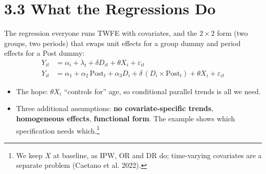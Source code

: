 \documentclass[
  11pt,
  ignorenonframetext,
  aspectratio=169,
]{beamer}
\providecommand{\tightlist}{%
  \setlength{\itemsep}{0pt}\setlength{\parskip}{0pt}}
\begin{document}
\section{3.3 What the Regressions Do}\label{what-the-regressions-do}

\begin{frame}{The regression everyone runs}
\protect{}\label{the-regression-everyone-runs}
TWFE with covariates, and the \(2 \times 2\) form (two groups, two
periods) that swaps unit effects for a group dummy and period effects
for a Post dummy: \[
\begin{aligned}
Y_{it} &= \alpha_i + \lambda_t + \delta D_{it} + \theta X_i + \varepsilon_{it} \\
Y_{it} &= \alpha_1 + \alpha_2\,\text{Post}_t + \alpha_3 D_i + \delta\,(D_i \times \text{Post}_t) + \theta X_i + \varepsilon_{it}
\end{aligned}
\]

\begin{itemize}
\tightlist
\item
  The hope: \(\theta X_i\) ``controls for'' age, so conditional parallel
  trends is all we need.
\item
  Three additional assumptions: \textbf{no covariate-specific trends},
  \textbf{homogeneous effects}, \textbf{functional form}. The example
  shows which specification needs
  which.\footnote{We keep $X$ at baseline, as IPW, OR and DR do; time-varying covariates are a separate problem (Caetano et al. 2022).}
\end{itemize}
\end{frame}
\end{document}
